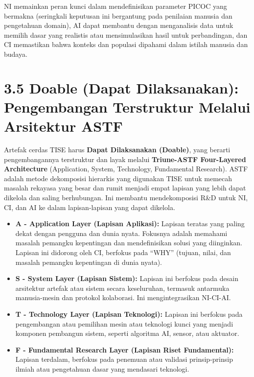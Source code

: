 \documentclass[
  letterpaper,
  DIV=11,
  numbers=noendperiod]{scrreprt}
\providecommand{\tightlist}{%
  \setlength{\itemsep}{0pt}\setlength{\parskip}{0pt}}
\begin{document}
NI memainkan peran kunci dalam mendefinisikan parameter PICOC yang
bermakna (seringkali keputusan ini bergantung pada penilaian manusia dan
pengetahuan domain), AI dapat membantu dengan menganalisis data untuk
memilih dasar yang realistis atau mensimulasikan hasil untuk
perbandingan, dan CI memastikan bahwa konteks dan populasi dipahami
dalam istilah manusia dan budaya.

\section{\texorpdfstring{\textbf{3.5 Doable (Dapat Dilaksanakan):
Pengembangan Terstruktur Melalui Arsitektur
ASTF}}{3.5 Doable (Dapat Dilaksanakan): Pengembangan Terstruktur Melalui Arsitektur ASTF}}\label{doable-dapat-dilaksanakan-pengembangan-terstruktur-melalui-arsitektur-astf}

Artefak cerdas TISE harus \textbf{Dapat Dilaksanakan (Doable)}, yang
berarti pengembangannya terstruktur dan layak melalui
\textbf{Triune-ASTF Four-Layered Architecture} (Application, System,
Technology, Fundamental Research). ASTF adalah metode dekomposisi
hierarkis yang digunakan TISE untuk memecah masalah rekayasa yang besar
dan rumit menjadi empat lapisan yang lebih dapat dikelola dan saling
berhubungan. Ini membantu mendekomposisi R\&D untuk NI, CI, dan AI ke
dalam lapisan-lapisan yang dapat dikelola.

\begin{itemize}
\tightlist
\item
  \textbf{A - Application Layer (Lapisan Aplikasi):} Lapisan teratas
  yang paling dekat dengan pengguna dan dunia nyata. Fokusnya adalah
  memahami masalah pemangku kepentingan dan mendefinisikan solusi yang
  diinginkan. Lapisan ini didorong oleh CI, berfokus pada ``WHY''
  (tujuan, nilai, dan masalah pemangku kepentingan di dunia nyata).
\item
  \textbf{S - System Layer (Lapisan Sistem):} Lapisan ini berfokus pada
  desain arsitektur artefak atau sistem secara keseluruhan, termasuk
  antarmuka manusia-mesin dan protokol kolaborasi. Ini mengintegrasikan
  NI-CI-AI.
\item
  \textbf{T - Technology Layer (Lapisan Teknologi):} Lapisan ini
  berfokus pada pengembangan atau pemilihan mesin atau teknologi kunci
  yang menjadi komponen pembangun sistem, seperti algoritma AI, sensor,
  atau aktuator.
\item
  \textbf{F - Fundamental Research Layer (Lapisan Riset Fundamental):}
  Lapisan terdalam, berfokus pada penemuan atau validasi prinsip-prinsip
  ilmiah atau pengetahuan dasar yang mendasari teknologi.
\end{itemize}
\end{document}
